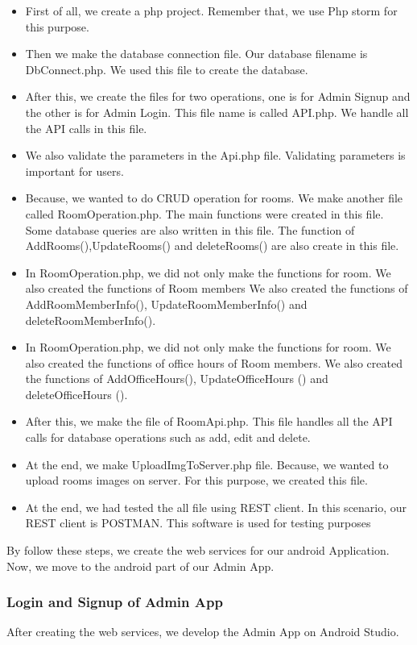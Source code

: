 \begin{itemize}
\item First of all, we create a php project. Remember that, we use Php storm for this purpose.
\item Then we make the database connection file. Our database filename is DbConnect.php. We used this file to create the database.
\item After this, we create the files for two operations, one is for Admin Signup and the other is for Admin Login. This file name is called API.php. We handle all the API calls in this file.
\item We also validate the parameters in the Api.php file. Validating parameters is important for users.
\item Because, we wanted to do CRUD operation for rooms. We make another file called RoomOperation.php. The main functions were created in this file. Some database queries are also written in this file. The function of AddRooms(),UpdateRooms() and deleteRooms() are also create in this file.
\item In RoomOperation.php, we did not only make the functions for room. We also created the functions of Room members We also created the functions of AddRoomMemberInfo(), UpdateRoomMemberInfo() and deleteRoomMemberInfo().
\item In RoomOperation.php, we did not only make the functions for room. We also created the functions of office hours of Room members. We also created the functions of AddOfficeHours(), UpdateOfficeHours () and deleteOfficeHours ().
\item After this, we make the file of RoomApi.php. This file handles all the API calls for database operations such as add, edit and delete.
\item At the end, we make UploadImgToServer.php file. Because, we wanted to upload rooms images on server. For this purpose, we created this file.
\item At the end, we had tested the all file using REST client. In this scenario, our REST client is POSTMAN. This software is used for testing purposes
\end{itemize}


By follow these steps, we create the web services for our android Application. Now, we move to the android part of our Admin App.
\subsubsection{Login and Signup of Admin App}
After creating the web services, we develop the Admin App on Android Studio.

